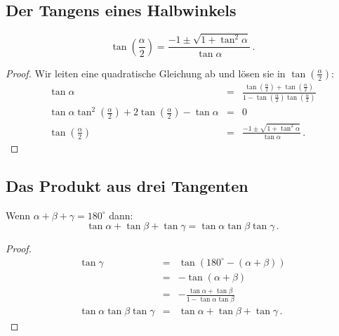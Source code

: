 
\subsection{Der Tangens eines Halbwinkels}\label{s.tangent-half}

\begin{theorem}\label{thm.tangent-half}
\[
\tan\left(\frac{\alpha}{2}\right) = \frac{-1\pm\sqrt{1+\tan^2\alpha}}{\tan\alpha}\,.
\]
\end{theorem}
\begin{proof}
Wir leiten eine quadratische Gleichung ab und lösen sie in $\displaystyle\tan\left(\displaystyle\frac{\alpha}{2}\right)$:
\begin{displaymath}
\begin{array}{lll}
\tan \alpha&=&\displaystyle\frac{
  \tan\left(\displaystyle\frac{\alpha}{2}\right)+
  \tan\left(\displaystyle\frac{\alpha}{2}\right)
  }{
  1-\tan\left(\displaystyle\frac{\alpha}{2}\right)
    \tan\left(\displaystyle\frac{\alpha}{2}\right)
  }\\
\tan\alpha \tan^2  \left(\displaystyle\frac{\alpha}{2}\right) + 2 \tan \left(\displaystyle\frac{\alpha}{2}\right) -\tan\alpha &=&0\\
\tan\left(\displaystyle\frac{\alpha}{2}\right) &=& \displaystyle\frac{-1\pm\sqrt{1+\tan^2\alpha}}{\tan\alpha}\,.
\end{array}
\end{displaymath}
\end{proof}


\subsection{Das Produkt aus drei Tangenten}\label{s.tangent-three}

\begin{theorem}\label{thm.tangent3}
Wenn $\alpha+\beta+\gamma=180^\circ$ dann:
\[
\tan\alpha+\tan\beta+\tan\gamma = \tan\alpha\tan\beta\tan\gamma\,.
\]
\end{theorem}

\begin{proof}
\begin{eqnarray*}
\tan\gamma &=& \tan (180^\circ-(\alpha+\beta))\\
&=& -\tan (\alpha+\beta)\\
&=& -\frac{\tan\alpha+\tan\beta}{1-\tan\alpha\tan\beta}\\
\tan\alpha\tan\beta\tan\gamma &=&\tan\alpha+\tan\beta+\tan\gamma\,.
\end{eqnarray*}
\end{proof}

